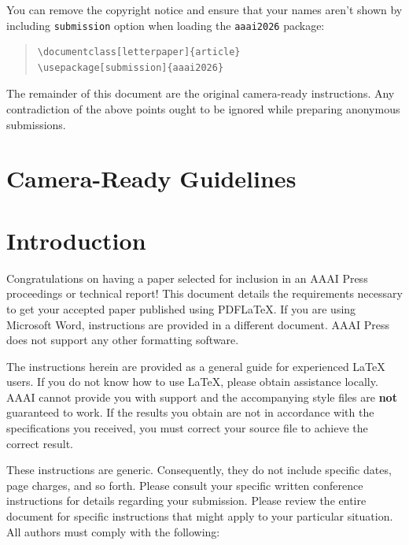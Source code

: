 \documentclass[letterpaper]{article} %
\begin{document}
You can remove the copyright notice and ensure that your names aren't shown by including \texttt{submission} option when loading the \texttt{aaai2026} package:

\begin{quote}\begin{scriptsize}\begin{verbatim}
\documentclass[letterpaper]{article}
\usepackage[submission]{aaai2026}
\end{verbatim}\end{scriptsize}\end{quote}

The remainder of this document are the original camera-ready instructions. Any contradiction of the above points ought to be ignored while preparing anonymous submissions.

\section{Camera-Ready Guidelines}
\else
\section{Introduction}
\fi

Congratulations on having a paper selected for inclusion in an AAAI Press proceedings or technical report! This document details the requirements necessary to get your accepted paper published using PDF\LaTeX{}. If you are using Microsoft Word, instructions are provided in a different document. AAAI Press does not support any other formatting software.

The instructions herein are provided as a general guide for experienced \LaTeX{} users. If you do not know how to use \LaTeX{}, please obtain assistance locally. AAAI cannot provide you with support and the accompanying style files are \textbf{not} guaranteed to work. If the results you obtain are not in accordance with the specifications you received, you must correct your source file to achieve the correct result.

These instructions are generic. Consequently, they do not include specific dates, page charges, and so forth. Please consult your specific written conference instructions for details regarding your submission. Please review the entire document for specific instructions that might apply to your particular situation. All authors must comply with the following:
\end{document}
